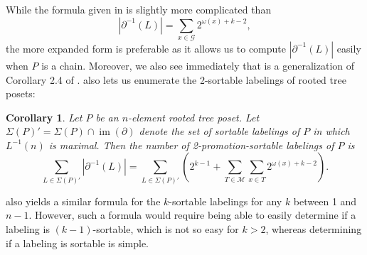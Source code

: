 \documentclass[11pt]{amsart}
\newtheorem{corollary}[thm]{Corollary}
\theoremstyle{definition}
\DeclareMathOperator{\im}{\mathrm{im}}
\newcommand{\inverse}{^{-1}}
\begin{document}
While the formula given in  is slightly more complicated than \[|\partial\inverse(L)|=\sum_{x\in\mathcal{G}}2^{\omega(x)+k-2},\] the more expanded form is preferable as it allows us to compute $ |\partial\inverse(L)| $ easily when $ P $ is a chain. Moreover, we also see immediately that  is a generalization of Corollary 2.4 of \cite{BCF}.  also lets us enumerate the 2-sortable labelings of rooted tree posets: 
\begin{corollary}
	Let $ P $ be an $ n $-element rooted tree poset. Let $ \Sigma(P)'=\Sigma(P)\cap\im(\partial) $ denote the set of sortable labelings of $ P $ in which $ L\inverse(n) $ is maximal. Then the number of 2-promotion-sortable labelings of $ P $ is \[\sum_{L\in\Sigma(P)'}|\partial\inverse(L)|=\sum_{L\in\Sigma(P)'}\left(2^{k-1}+\sum_{T\in\mathcal{M}}\sum_{x\in T}2^{\omega(x)+k-2}\right).\]
\end{corollary} 
 also yields a similar formula for the $ k $-sortable labelings for any $ k $ between 1 and $ n-1 $. However, such a formula would require being able to easily determine if a labeling is $ (k-1) $-sortable, which is not so easy for $ k>2 $, whereas determining if a labeling is sortable is simple. 
\end{document}
